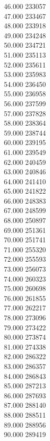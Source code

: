 { 46.000	233057 \\
 47.000	233467 \\
 48.000	233918 \\
 49.000	234248 \\
 50.000	234721 \\
 51.000	235113 \\
 52.000	235611 \\
 53.000	235983 \\
 54.000	236450 \\
 55.000	236958 \\
 56.000	237599 \\
 57.000	237828 \\
 58.000	238364 \\
 59.000	238744 \\
 60.000	239195 \\
 61.000	239549 \\
 62.000	240459 \\
 63.000	240846 \\
 64.000	241410 \\
 65.000	241822 \\
 66.000	248383 \\
 67.000	248599 \\
 68.000	250897 \\
 69.000	251361 \\
 70.000	251741 \\
 71.000	255320 \\
 72.000	255593 \\
 73.000	256073 \\
 74.000	260323 \\
 75.000	260698 \\
 76.000	261855 \\
 77.000	262217 \\
 78.000	273096 \\
 79.000	273422 \\
 80.000	273874 \\
 81.000	274338 \\
 82.000	286322 \\
 83.000	286357 \\
 84.000	286843 \\
 85.000	287213 \\
 86.000	287693 \\
 87.000	288140 \\
 88.000	288511 \\
 89.000	288956 \\
 90.000	289419 \\
}
